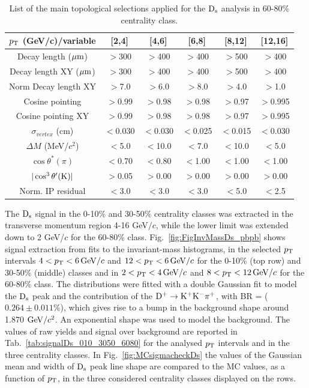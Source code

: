 \begin{table}[!h]
 \begin{center}
  \begin{tabular}{|c|c|c|c|c|c|}
\hline
$p_{\rm T}$ (GeV/c)/variable & [2,4] & [4,6] & [6,8] & [8,12] & [12,16] \\
\hline
\hline
Decay length ($\mathrm{\mu m}$)                 & $>$300 & $>$400 & $>$400 & $>$500 & $>$400\\
\hline
Decay length XY ($\mathrm{\mu m}$)            & $>$300 & $>$400 & $>$400 & $>$500 & $>$400\\
\hline
Norm Decay length XY                   & $>$7.0& $>$6.0 & $>$8.0 & $>$4.0 & $>$1.0\\
\hline
Cosine pointing                               & $>$0.99 & $>$0.98 & $>$0.98 & $>$0.97 & $>$0.995\\
\hline
Cosine pointing XY                          & $>$0.99 & $>$0.98 & $>$0.98 & $>$0.97 & $>$0.995\\
\hline
$\sigma_{vertex}$  (cm)                   & $<$0.030 & $<$0.030 & $<$0.025 & $<$0.015 & $<$0.030\\
\hline
$\Delta M$ (MeV/$c^{2}$) & $<$5.0 & $<$10.0 & $<$7.0 & $<$10.0 & $<$5.0\\
\hline
$\cos \theta^*(\pi)$                             & $<$0.70 & $<$0.80 & $<$1.00 & $<$1.00 & $<$1.00\\
\hline
$|\cos^3 \theta^\prime({\rm K})|$        & $>$0.05 & $>$0.00 & $>$0.00 & $>$0.00 & $>$0.00\\
\hline
Norm. IP residual                               & $<$3.0 & $<$3.0 & $<$3.0 & $<$5.0 & $<$2.5 \\[1ex]
\hline
  \end{tabular}
 \caption{List of the main topological selections applied for the
   ${\rm D_s}$ analysis in 60-80\% centrality class.}
 \label{tab:topologicalselections_ds_6080}
 \end{center}
\end{table}

 The ${\rm D_s}$ signal in the 0-10$\%$ and 30-50\% centrality classes was extracted in the transverse
momentum region 4-16 GeV$/c$, while the lower limit was extended down to 2 GeV/$c$
for the 60-80\% class. Fig.~\ref{fig:FigInvMassDs_pbpb} shows signal extraction
from fits to the invariant-mass histograms, in the selected $p_{\rm T}$ intervals
$4 < p_{\rm T} <6 \, \mathrm{GeV}/c$ and $12 < p_{\rm T} < 6 \, \mathrm{GeV}/c$ for the 0-10\% (top row) and 30-50\%
(middle) classes and in $2 < p_{\rm T} < 4 \, \mathrm{GeV}/c$ and  $8 < p_{\rm T} < 12 \, \mathrm{GeV}/c$ for
the 60-80\% class. The distributions were fitted with a double Gaussian fit to model
the ${\rm D_s}$ peak and the contribution of the ${\rm D^{+}\to K^+ K^-\pi^+}$, with BR = ($0.264 \pm 0.011\%$),
which gives rise to a bump in the background shape around 1.870 $\mathrm{GeV}/c^{2}$. 
An exponential shape was used to model the background.
The values of raw yields and signal over background are reported in
Tab.~\ref{tab:signalDs_010_3050_6080} for the analysed $p_{\rm T}$ intervals and in the three centrality classes.
In Fig.~\ref{fig:MCsigmacheckDs} the values of the Gaussian mean and width of ${\rm D_s}$ 
peak line shape are compared to the MC values, as a function of $p_{\rm T}$, in the 
three considered centrality classes displayed on the rows.

